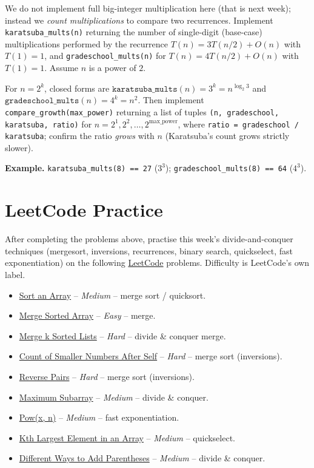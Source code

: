 \documentclass[11pt]{article}
\begin{document}
We do not implement full big-integer multiplication here (that is next week); instead we
\emph{count multiplications} to compare two recurrences. Implement
\texttt{karatsuba\_mults(n)} returning the number of single-digit (base-case) multiplications
performed by the recurrence $T(n) = 3T(n/2) + O(n)$ with $T(1) = 1$, and
\texttt{gradeschool\_mults(n)} for $T(n) = 4T(n/2) + O(n)$ with $T(1) = 1$. Assume $n$ is a
power of $2$.

For $n = 2^k$, closed forms are $\texttt{karatsuba\_mults}(n) = 3^k = n^{\log_2 3}$ and
$\texttt{gradeschool\_mults}(n) = 4^k = n^2$. Then implement
\texttt{compare\_growth(max\_power)} returning a list of tuples
\texttt{(n, gradeschool, karatsuba, ratio)} for $n = 2^1, 2^2, \ldots, 2^{\text{max\_power}}$,
where \texttt{ratio = gradeschool / karatsuba}; confirm the ratio \emph{grows} with $n$
(Karatsuba's count grows strictly slower).

\textbf{Example.} \texttt{karatsuba\_mults(8) == 27} ($3^3$);
\texttt{gradeschool\_mults(8) == 64} ($4^3$).

\newpage
\section{LeetCode Practice}

After completing the problems above, practise this week's divide-and-conquer techniques
(mergesort, inversions, recurrences, binary search, quickselect, fast exponentiation) on the
following \href{https://leetcode.com}{LeetCode} problems. Difficulty is LeetCode's own label.

\begin{itemize}
  \item \href{https://leetcode.com/problems/sort-an-array/}{Sort an Array} -- \emph{Medium} -- merge sort / quicksort.
  \item \href{https://leetcode.com/problems/merge-sorted-array/}{Merge Sorted Array} -- \emph{Easy} -- merge.
  \item \href{https://leetcode.com/problems/merge-k-sorted-lists/}{Merge k Sorted Lists} -- \emph{Hard} -- divide \& conquer merge.
  \item \href{https://leetcode.com/problems/count-of-smaller-numbers-after-self/}{Count of Smaller Numbers After Self} -- \emph{Hard} -- merge sort (inversions).
  \item \href{https://leetcode.com/problems/reverse-pairs/}{Reverse Pairs} -- \emph{Hard} -- merge sort (inversions).
  \item \href{https://leetcode.com/problems/maximum-subarray/}{Maximum Subarray} -- \emph{Medium} -- divide \& conquer.
  \item \href{https://leetcode.com/problems/powx-n/}{Pow(x, n)} -- \emph{Medium} -- fast exponentiation.
  \item \href{https://leetcode.com/problems/kth-largest-element-in-an-array/}{Kth Largest Element in an Array} -- \emph{Medium} -- quickselect.
  \item \href{https://leetcode.com/problems/different-ways-to-add-parentheses/}{Different Ways to Add Parentheses} -- \emph{Medium} -- divide \& conquer.
\end{itemize}
\end{document}
